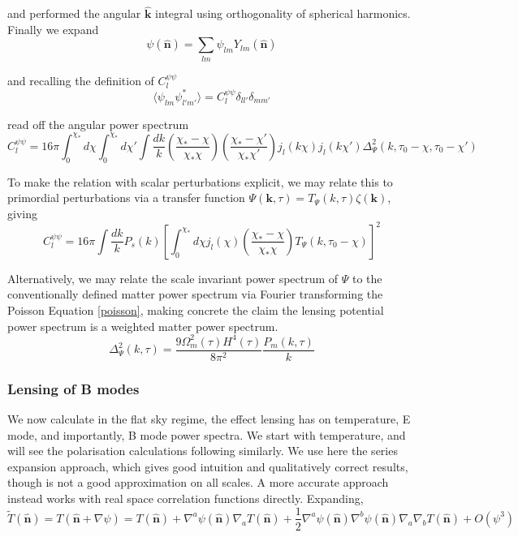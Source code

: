 \documentclass[a4paper,10pt]{article}
\renewcommand{\v}[1]{\mathbf{#1}}
\newcommand{\half}{\frac{1}{2}}
\newcommand{\unit}[1]{\hat{\v{#1}}}
\begin{document}
and performed the angular $\unit{k}$ integral using orthogonality of spherical harmonics. Finally we expand
\begin{equation}
\psi(\unit{n}) = \sum_{lm}\psi_{lm}Y_{lm}(\unit{n})
\end{equation}

and recalling the definition of $C_l^{\psi\psi}$
\begin{equation}
\langle \psi_{lm}\psi_{l'm'}^* \rangle = C_l^{\psi\psi} \delta_{ll'}\delta_{mm'}
\end{equation}

read off the angular power spectrum
\begin{equation}
C_l^{\psi\psi} = 16\pi \int_0^{\chi_*} d\chi \int_0^{\chi_*} d\chi' \int \frac{dk}{k} (\frac{\chi_*-\chi}{\chi_*\chi})(\frac{\chi_*-\chi'}{\chi_*\chi'})j_l(k\chi)j_l(k\chi')\Delta^2_\Psi(k, \tau_0-\chi, \tau_0-\chi')
\end{equation}

To make the relation with scalar perturbations explicit, we may relate this to primordial perturbations via a transfer function $\Psi(\v{k},\tau)=T_\Psi(k,\tau)\zeta(\v{k})$, giving
\begin{equation}
C_l^{\psi\psi} = 16\pi \int \frac{dk}{k} P_s(k) \left[\int_0^{\chi_*} d\chi j_l(\chi) (\frac{\chi_*-\chi}{\chi_*\chi})T_\Psi(k, \tau_0-\chi)\right]^2
\end{equation}

Alternatively, we may relate the scale invariant power spectrum of $\Psi$ to the conventionally defined matter power spectrum via Fourier transforming the Poisson Equation \ref{poisson}, making concrete the claim the lensing potential power spectrum is a weighted matter power spectrum.
\begin{equation}
\Delta^2_\Psi(k,\tau) = \frac{9\Omega^2_m(\tau)H^4(\tau)}{8\pi^2}\frac{P_m(k,\tau)}{k}
\end{equation}

\subsubsection{Lensing of B modes} 

We now calculate in the flat sky regime, the effect lensing has on temperature, E mode, and importantly, B mode power spectra. We start with temperature, and will see the polarisation calculations following similarly. We use here the series expansion approach, which gives good intuition and qualitatively correct results, though is not a good approximation on all scales. A more accurate approach instead works with real space correlation functions directly. Expanding,
\begin{equation}
\tilde{T}(\unit{n}) = T(\unit{n}+\nabla\psi) =T(\unit{n})+\nabla^a\psi(\unit{n})\nabla_aT(\unit{n})+\half\nabla^a\psi(\unit{n})\nabla^b\psi(\unit{n})\nabla_a\nabla_bT(\unit{n})+O(\psi^3)
\end{equation}
\end{document}
